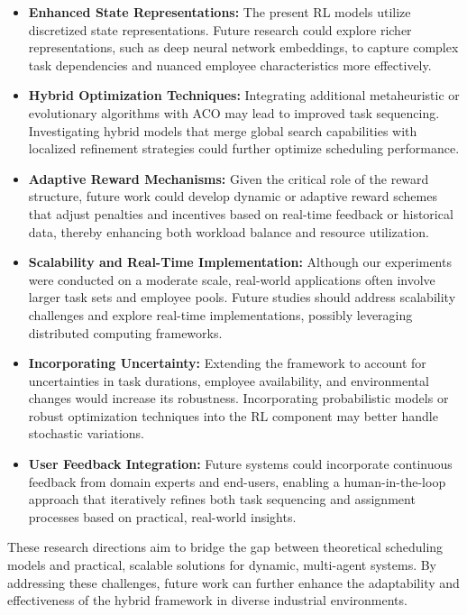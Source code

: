 \documentclass[%
aip,
cp,  %
amsmath,amssymb,
reprint,%
]{revtex4-2}
\begin{document}
	\begin{itemize}
		\item \textbf{Enhanced State Representations:} The present RL models utilize
		discretized state representations. Future research could explore richer representations,
		such as deep neural network embeddings, to capture complex task dependencies
		and nuanced employee characteristics more effectively.
		
		\item \textbf{Hybrid Optimization Techniques:} Integrating additional
		metaheuristic or evolutionary algorithms with ACO may lead to improved
		task sequencing. Investigating hybrid models that merge global search capabilities
		with localized refinement strategies could further optimize scheduling performance.
		
		\item \textbf{Adaptive Reward Mechanisms:} Given the critical role of the
		reward structure, future work could develop dynamic or adaptive reward schemes
		that adjust penalties and incentives based on real-time feedback or historical
		data, thereby enhancing both workload balance and resource utilization.
		
		\item \textbf{Scalability and Real-Time Implementation:} Although our
		experiments were conducted on a moderate scale, real-world applications often
		involve larger task sets and employee pools. Future studies should address
		scalability challenges and explore real-time implementations, possibly leveraging
		distributed computing frameworks.
		
		\item \textbf{Incorporating Uncertainty:} Extending the framework to account
		for uncertainties in task durations, employee availability, and
		environmental changes would increase its robustness. Incorporating probabilistic
		models or robust optimization techniques into the RL component may better handle
		stochastic variations.
		
		\item \textbf{User Feedback Integration:} Future systems could incorporate
		continuous feedback from domain experts and end-users, enabling a human-in-the-loop
		approach that iteratively refines both task sequencing and assignment processes
		based on practical, real-world insights.
	\end{itemize}
	
	These research directions aim to bridge the gap between theoretical scheduling
	models and practical, scalable solutions for dynamic, multi-agent systems. By addressing
	these challenges, future work can further enhance the adaptability and
	effectiveness of the hybrid framework in diverse industrial environments.
	
\end{document}
